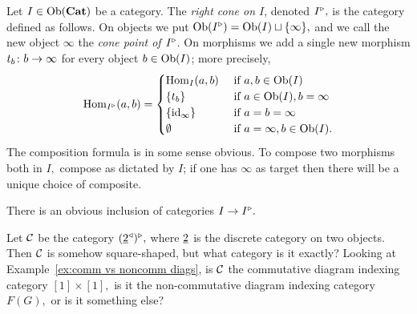 \documentclass[../main/CT4S-EN-RU]{subfiles}
\begin{document}
\begin{definitionENG}\label{def:rcone}
Let $I\in\operatorname{Ob}({\mathbf{Cat}})$ be a category. The {\em right cone on $I$}, denoted $I^\triangleright,$ is the category defined as follows. On objects we put $\operatorname{Ob}(I^\triangleright)=\operatorname{Ob}(I)\sqcup\{\infty\},$ and we call the new object $\infty$ the {\em cone point of $I^\triangleright$}. On morphisms we add a single new morphism $t_b\colon b\rightarrow\infty$ for every object $b\in \operatorname{Ob}(I)$; more precisely,
$$\operatorname{Hom}_{I^\triangleright}(a,b)=
\begin{cases}
\operatorname{Hom}_I(a,b)&\textnormal{ if }a,b\in\operatorname{Ob}(I)\\
\{t_b\}&\textnormal{ if }a\in\operatorname{Ob}(I), b=\infty\\
\{\operatorname{id}_{\infty}\}&\textnormal{ if } a=b=\infty\\
\emptyset&\textnormal{ if } a=\infty,b\in\operatorname{Ob}(I).
\end{cases}$$
The composition formula is in some sense obvious. To compose two morphisms both in $I,$ compose as dictated by $I$; if one has $\infty$ as target then there will be a unique choice of composite.

There is an obvious inclusion of categories $I\rightarrow I^\triangleright.$
\end{definitionENG}

\begin{definitionRUS}\label{def:rcone}
\end{definitionRUS}

\begin{exerciseENG}
Let $\mathcal{C}$ be the category $(\underline{2}^\triangleleft)^\triangleright,$ where $\underline{2}$ is the discrete category on two objects. Then $\mathcal{C}$ is somehow square-shaped, but what category is it exactly? Looking at Example~\ref{ex:comm vs noncomm diags}, is $\mathcal{C}$ the commutative diagram indexing category $[1]\times[1],$ is it the non-commutative diagram indexing category $F(G),$ or is it something else?
\end{exerciseENG}

\begin{exerciseRUS}
\end{exerciseRUS}


\subsection{}\label{sec:lims and colims in a cat}
\end{document}
